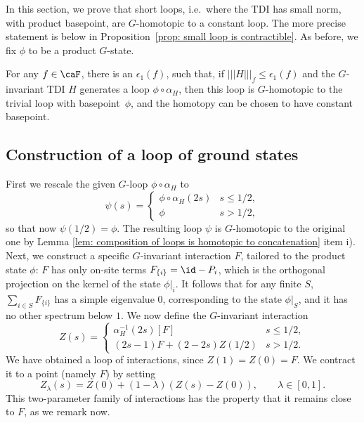 In this section, we prove that short loops, i.e.\ where the TDI has small norm, with product basepoint, are $G$-homotopic to a constant loop. The more precise statement is below in Proposition~\ref{prop: small loop is contractible}.  As before, we fix $\phi$ to be a product $G$-state.
%
%
%
\begin{proposition}\label{prop: small loop is contractible}
	For any $f\in\caF$, there is an $\epsilon_1(f)$, such that, if $|||H|||_f\leq \epsilon_1(f)$ and the $G$-invariant TDI $H$ generates a loop $\phi\circ\alpha_H$, then this loop is $G$-homotopic to the trivial loop with basepoint~$\phi$, and the homotopy can be chosen to have constant basepoint. 
\end{proposition}
%
%
%
%
%
%
\subsection{Construction of a loop of ground states}\label{sec: construction of loop of gs}
First we rescale the given $G$-loop $\phi\circ\alpha_H$ to
\begin{equation}\label{Rescaled loop}
\psi(s)=\begin{cases}  \phi\circ\alpha_H(2s)  &  s\leq 1/2, \\  
\phi &   s>1/2,
\end{cases}
\end{equation}
so that now $\psi(1/2)=\phi$. The resulting loop $\psi$ is $G$-homotopic to the original one by Lemma \ref{lem: composition of loops is homotopic to concatenation} item i).  Next, we construct a specific $G$-invariant interaction $F$, tailored to the product state $\phi$:
$F$ has only on-site terms $F_{\{i\}}= \id-P_i$, which is the orthogonal projection on the kernel of the state $\phi|_i$. It follows that for any finite $S$, $\sum_{i \in S} F_{\{i\}}$ has a simple eigenvalue $0$, corresponding to the state $\phi|_S$, and it has no other spectrum below $1$.  
We now define the $G$-invariant interaction
$$
Z(s)= \begin{cases}  \alpha^{-1}_H(2s)[F] & s \leq 1/2,  \\[2mm]
(2s-1)F+    (2-2s)Z(1/2)   & s >1/2.
\end{cases}
$$
We have obtained a loop of interactions, since $Z(1)=Z(0)=F$. We contract it to a point (namely $F$) by setting
$$
Z_{\lambda}(s)  =Z(0)+ (1-\lambda)( Z(s)-Z(0)), \qquad  \lambda \in [0,1].
$$ 
This two-parameter family of interactions has the property that it remains close to $F$, as we remark now. 
